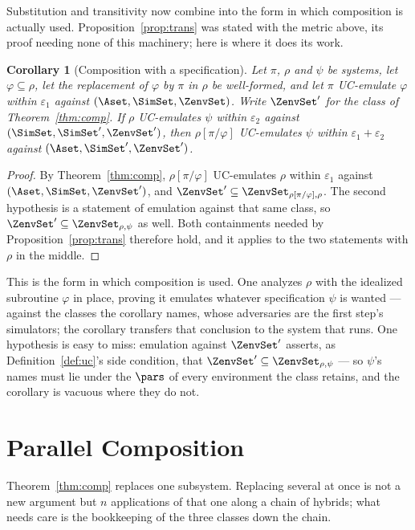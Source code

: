 \documentclass[10pt,oneside,openany]{book}
\theoremstyle{accentdef}
\theoremstyle{accentplain}
\newtheorem{corollary}[definition]{Corollary}
\begin{document}
Substitution and transitivity now combine into the form in which composition is actually used.
Proposition~\ref{prop:trans} was stated with the metric above, its proof needing none of this
machinery; here is where it does its work.

\begin{corollary}[Composition with a specification]\label{cor:comp}
Let $\pi$, $\rho$ and $\psi$ be systems, let $\varphi \subseteq \rho$, let the replacement of
$\varphi$ by $\pi$ in $\rho$ be well-formed, and let $\pi$ UC-emulate $\varphi$ within
$\varepsilon_1$ against $(\Aset,\SimSet,\ZenvSet)$. Write $\ZenvSet'$ for the class of Theorem~\ref{thm:comp}. If $\rho$ UC-emulates
$\psi$ within $\varepsilon_2$ against $(\SimSet,\SimSet',\ZenvSet')$, then $\rho[\pi/\varphi]$
UC-emulates $\psi$ within $\varepsilon_1 + \varepsilon_2$ against $(\Aset,\SimSet',\ZenvSet')$.
\end{corollary}

\begin{proof}
By Theorem~\ref{thm:comp}, $\rho[\pi/\varphi]$ UC-emulates $\rho$ within $\varepsilon_1$
against $(\Aset,\SimSet,\ZenvSet')$, and $\ZenvSet' \subseteq \ZenvSet_{\rho[\pi/\varphi],\rho}$.
The second hypothesis is a statement of emulation against that same class, so $\ZenvSet' \subseteq \ZenvSet_{\rho,\psi}$
as well. Both containments needed by Proposition~\ref{prop:trans} therefore hold, and it
applies to the two statements with $\rho$ in the middle.
\end{proof}

This is the form in which composition is used. One analyzes $\rho$ with the idealized subroutine
$\varphi$ in place, proving it emulates whatever specification $\psi$ is wanted --- against the
classes the corollary names, whose adversaries are the first step's simulators; the corollary
transfers that conclusion to the system that runs. One hypothesis is easy to miss: emulation
against $\ZenvSet'$ asserts, as Definition~\ref{def:uc}'s side condition, that
$\ZenvSet' \subseteq \ZenvSet_{\rho,\psi}$ --- so $\psi$'s names must lie under the $\pars$ of
every environment the class retains, and the corollary is vacuous where they do not.

\section{Parallel Composition}\label{app:parallel}

Theorem~\ref{thm:comp} replaces one subsystem. Replacing several at once is not a new argument
but $n$ applications of that one along a chain of hybrids; what needs care is the bookkeeping of
the three classes down the chain.
\end{document}
